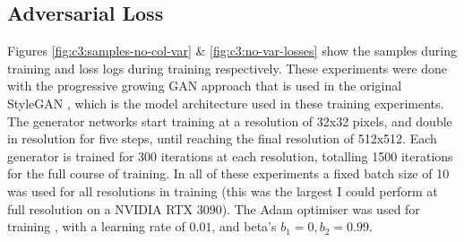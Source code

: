 \subsection{Adversarial Loss}

Figures \ref{fig:c3:samples-no-col-var} \& \ref{fig:c3:no-var-losses} show the samples during training and loss logs during training respectively.
These experiments were done with the progressive growing GAN approach \citep{karras2017progressive} that is used in the original StyleGAN \citep{karras2019style}, which is the model architecture used in these training experiments.
The generator networks start training at a resolution of 32x32 pixels, and double in resolution for five steps, until reaching the final resolution of 512x512. 
Each generator is trained for 300 iterations at each resolution, totalling 1500 iterations for the full course of training.
In all of these experiments a fixed batch size of 10 was used for all resolutions in training (this was the largest I could perform at full resolution on a NVIDIA RTX 3090). 
The Adam optimiser was used for training \citep{kingma2014adam}, with a learning rate of $0.01$, and beta's $b_{1} = 0, b_{2} = 0.99$.

\label{c4:sec:og-loss}

